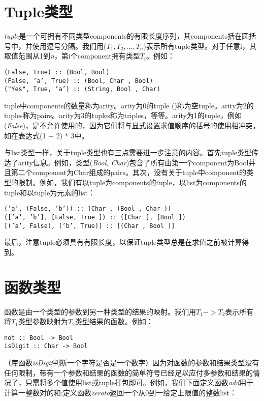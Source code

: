\section{Tuple类型}
\textit{tuple}是一个可拥有不同类型components的有限长度序列，其components括在圆括号中，并使用逗号分隔。我们用(\textit{$T_1,T_2,...,T_n$})表示所有tuple类型。对于任意i，其取值范围从1到\textit{n}，第i个component拥有类型$T_i$。例如：
\begin{verbatim}
(False, True) :: (Bool, Bool)
(False, ’a’, True) :: (Bool, Char , Bool)
("Yes", True, ’a’) :: (String, Bool , Char)
\end{verbatim}

tuple中components的数量称为arity。arity为0的tuple
()称为空tuple。arity为2的tuples称为pairs。arity为3的tuples称为triples，等等。arity为1的tuple，例如(\textit{False})，是不允许使用的，因为它们将与显式设置求值顺序的括号的使用相冲突，如在表达式(1
+ 2) * 3中。

与list类型一样，关于tuple类型也有三点需要进一步注意的内容。首先tuple类型传达了arity信息。例如，类型(\textit{Bool,
Char})包含了所有由第一个component为Bool并且第二个component为Char组成的pairs。其次，没有关于tuple中component的类型的限制。例如，我们有以tuple为components的tuple，以list为components的tuple和以tuple为元素的list：

\begin{verbatim}
(’a’, (False, ’b’)) :: (Char , (Bool , Char ))
([’a’, ’b’], [False, True ]) :: ([Char ], [Bool ])
[(’a’, False), (’b’, True)] :: [(Char , Bool )]
\end{verbatim}

最后，注意tuple必须具有有限长度，以保证tuple类型总是在求值之前被计算得到。

\section{函数类型}
函数是由一个类型的参数到另一种类型的结果的映射。我们用\textit{$T_1->T_2$}表示所有将$T_1$类型参数映射为$T_2$类型结果的函数。例如：
\begin{verbatim}
not :: Bool -> Bool
isDigit :: Char -> Bool
\end{verbatim}

（库函数\textit{isDigit}判断一个字符是否是一个数字）因为对函数的参数和结果类型没有任何限制，带有一个参数和结果的函数的简单符号已经足以应付多参数和结果的情况了，只需将多个值使用list或tuple打包即可。例如，我们下面定义函数\textit{add}用于计算一整数对的和;定义函数\textit{zeroto}返回一个从0到一给定上限值的整数list：


